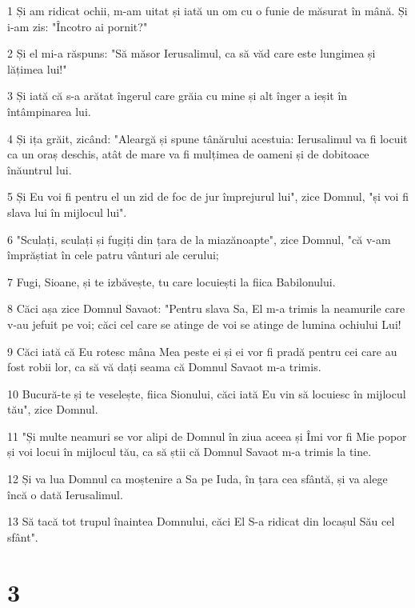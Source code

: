 \par 1 Și am ridicat ochii, m-am uitat și iată un om cu o funie de măsurat în mână. Și i-am zis: "Încotro ai pornit?"
\par 2 Și el mi-a răspuns: "Să măsor Ierusalimul, ca să văd care este lungimea și lățimea lui!"
\par 3 Și iată că s-a arătat îngerul care grăia cu mine și alt înger a ieșit în întâmpinarea lui.
\par 4 Și ița grăit, zicând: "Aleargă și spune tânărului acestuia: Ierusalimul va fi locuit ca un oraș deschis, atât de mare va fi mulțimea de oameni și de dobitoace înăuntrul lui.
\par 5 Și Eu voi fi pentru el un zid de foc de jur împrejurul lui", zice Domnul, "și voi fi slava lui în mijlocul lui".
\par 6 "Sculați, sculați și fugiți din țara de la miazănoapte", zice Domnul, "că v-am împrăștiat în cele patru vânturi ale cerului;
\par 7 Fugi, Sioane, și te izbăvește, tu care locuiești la fiica Babilonului.
\par 8 Căci așa zice Domnul Savaot: "Pentru slava Sa, El m-a trimis la neamurile care v-au jefuit pe voi; căci cel care se atinge de voi se atinge de lumina ochiului Lui!
\par 9 Căci iată că Eu rotesc mâna Mea peste ei și ei vor fi pradă pentru cei care au fost robii lor, ca să vă dați seama că Domnul Savaot m-a trimis.
\par 10 Bucură-te și te veselește, fiica Sionului, căci iată Eu vin să locuiesc în mijlocul tău", zice Domnul.
\par 11 "Și multe neamuri se vor alipi de Domnul în ziua aceea și Îmi vor fi Mie popor și voi locui în mijlocul tău, ca să știi că Domnul Savaot m-a trimis la tine.
\par 12 Și va lua Domnul ca moștenire a Sa pe Iuda, în țara cea sfântă, și va alege încă o dată Ierusalimul.
\par 13 Să tacă tot trupul înaintea Domnului, căci El S-a ridicat din locașul Său cel sfânt".

\chapter{3}

